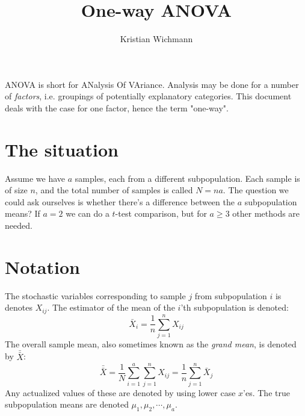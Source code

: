 \documentclass[12pt, a4paper]{article}
\title{One-way ANOVA}
\author{Kristian Wichmann}
\newcommand*{\doublebar}[1]{\bar{\bar{#1}}}
\begin{document}
\maketitle

ANOVA is short for ANalysis Of VAriance. Analysis may be done for a number of \textit{factors}, i.e. groupings of potentially explanatory categories. This document deals with the case for one factor, hence the term "one-way".

\section{The situation}
Assume we have $a$ samples, each from a different subpopulation. Each sample is of size $n$, and the total number of samples is called $N=na$. The question we could ask ourselves is whether there's a difference between the $a$ subpopulation means? If $a=2$ we can do a $t$-test comparison, but for $a\ge 3$ other methods are needed.

\section{Notation}
The stochastic variables corresponding to sample $j$ from subpopulation $i$ is denotes $X_{ij}$. The estimator of the mean of the $i$'th subpopulation is denoted:
\begin{equation}
\bar{X}_i=\frac{1}{n}\sum_{j=1}^n X_{ij}
\end{equation}
The overall sample mean, also sometimes known as the \textit{grand mean}, is denoted by $\doublebar{X}$:
\begin{equation}
\doublebar{X}=\frac{1}{N}\sum_{i=1}^a\sum_{j=1}^n X_{ij}=\frac{1}{n}\sum_{j=1}^n \bar{X}_j
\end{equation}
Any actualized values of these are denoted by using lower case $x$'es. The true subpopulation means are denoted $\mu_1, \mu_2,\cdots, \mu_a$.
\end{document}
